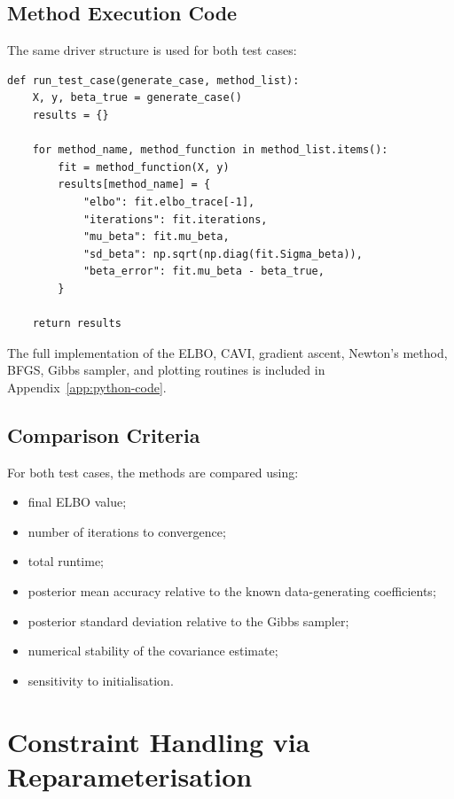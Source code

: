 \documentclass[11pt,a4paper]{article}
\begin{document}
\subsection*{Method Execution Code}

The same driver structure is used for both test cases:

\begin{verbatim}
def run_test_case(generate_case, method_list):
    X, y, beta_true = generate_case()
    results = {}

    for method_name, method_function in method_list.items():
        fit = method_function(X, y)
        results[method_name] = {
            "elbo": fit.elbo_trace[-1],
            "iterations": fit.iterations,
            "mu_beta": fit.mu_beta,
            "sd_beta": np.sqrt(np.diag(fit.Sigma_beta)),
            "beta_error": fit.mu_beta - beta_true,
        }

    return results
\end{verbatim}

The full implementation of the ELBO, CAVI, gradient ascent, Newton's method, BFGS, Gibbs sampler, and plotting routines is included in Appendix~\ref{app:python-code}.

\subsection*{Comparison Criteria}

For both test cases, the methods are compared using:
\begin{itemize}
\item final ELBO value;
\item number of iterations to convergence;
\item total runtime;
\item posterior mean accuracy relative to the known data-generating coefficients;
\item posterior standard deviation relative to the Gibbs sampler;
\item numerical stability of the covariance estimate;
\item sensitivity to initialisation.
\end{itemize}

\newpage
\section*{Constraint Handling via Reparameterisation}
\end{document}
